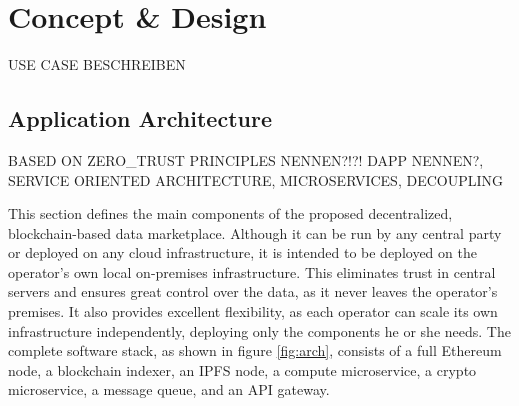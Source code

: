 \chapter{Concept \& Design}
\label{cha:cod}

USE CASE BESCHREIBEN

\section{Application Architecture}
\label{section:software_architecture}

BASED ON ZERO_TRUST PRINCIPLES NENNEN?!?! DAPP NENNEN?, SERVICE ORIENTED ARCHITECTURE, MICROSERVICES, DECOUPLING

This section defines the main components of the proposed decentralized, blockchain-based data marketplace. Although it can be run by any central party or deployed on any cloud infrastructure, it is intended to be deployed on the operator's own local on-premises infrastructure. This eliminates trust in central servers and ensures great control over the data, as it never leaves the operator's premises. It also provides excellent flexibility, as each operator can scale its own infrastructure independently, deploying only the components he or she needs. The complete software stack, as shown in figure \ref{fig:arch}, consists of a full Ethereum node, a blockchain indexer, an IPFS node, a compute microservice, a crypto microservice, a message queue, and an API gateway.



